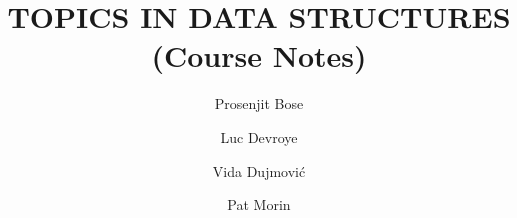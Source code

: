 \documentclass[ccfonts,lotsofwhite,oneside]{patsbook}
\title{\MakeUppercase{Topics in Data Structures} \\ (Course Notes)}
\author{Prosenjit Bose \and Luc Devroye \and Vida Dujmovi\'c  \and Pat Morin}
\begin{document}
\begin{titlepage}
\maketitle
\thispagestyle{empty}
\end{titlepage}


\tableofcontents











































\end{document}
